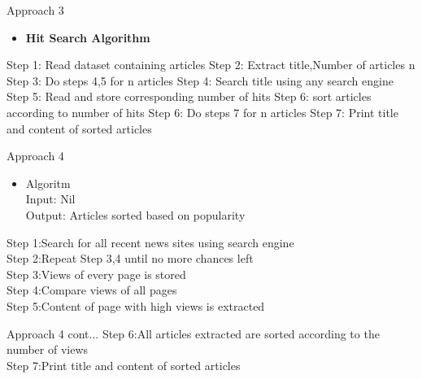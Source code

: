 \documentclass{beamer}
\begin{document}
	
	
	       
	
	\begin{frame}{Approach 3}
		\begin{itemize}
			\item \Large \textbf{Hit Search Algorithm}
		\end{itemize}
		\Large{Step 1: Read dataset containing articles \newline
		Step 2: Extract title,Number of articles n \newline
		Step 3: Do steps 4,5 for n articles \newline
		Step 4: Search title using any search engine \newline
		Step 5: Read and store corresponding number of hits \newline
		Step 6: sort articles according to number of hits \newline
		Step 6: Do steps 7 for n articles \newline
		Step 7: Print title and content of sorted articles}
		
	\end{frame}
	\begin{frame}{Approach 4}
		   \begin{itemize}
        	\item \Large Algoritm\\
        	\footnotesize
        	\Large{Input: Nil\\
        	Output: Articles sorted based on popularity \\  }
   	   \end{itemize}	
           \Large{ Step 1:Search for all recent news sites using search engine\\
            Step 2:Repeat Step 3,4 until no more chances left\\
            Step 3:Views of every page is stored\\
            Step 4:Compare views of all pages\\
            Step 5:Content of page with high views is extracted\\
            }


	\end{frame}
	\begin{frame}{Approach 4 cont...}
	    \Large{
            Step 6:All articles extracted are sorted according to the number of views\\
            Step 7:Print title and content of sorted articles\\} 
	\end{frame}
\end{document}
